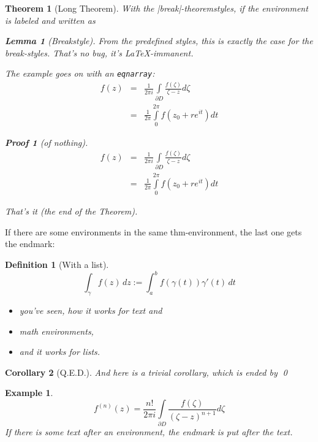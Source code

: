 \documentclass{article}
\theoremstyle{marginbreak}
\newtheorem{Theorem}{Theorem}
\theoremstyle{changebreak}
\newtheorem{Lemma}{Lemma}
\newtheorem{Corollary}[Theorem]{Corollary}
\theoremstyle{change}
\newtheorem{Example}{Example}
\theoremstyle{plain}
\newtheorem{Definition}{Definition}
\theoremstyle{nonumberplain}
\newtheorem{Proof}{Proof}
\begin{document}
\begin{Theorem}[Long Theorem]
With the |break|-theoremstyles, if the environment is labeled and 
written as
\begin{Lemma}[Breakstyle]\label{breakstyle}%
From the predefined styles, this is exactly the case for the break-styles.
That's no bug, it's \LaTeX-immanent.

The example goes on with an \verb|eqnarray|:
\begin{eqnarray}
f(z) &=&
   \frac{1}{2\pi i}
   \int \limits_{\partial D} \frac{f(\zeta)}{\zeta-z} d\zeta \\
&= &
   \frac{1}{2\pi}
   \int \limits_0^{2\pi}
      f(z_0 + re^{it}) dt
\end{eqnarray}
\end{Lemma}

\begin{Proof}[of nothing]
\begin{eqnarray*}
f(z) &=&
   \frac{1}{2\pi i}
   \int \limits_{\partial D} \frac{f(\zeta)}{\zeta-z} d\zeta \\
&= &
   \frac{1}{2\pi}
   \int \limits_0^{2\pi}
      f(z_0 + re^{it}) dt
\end{eqnarray*}
\end{Proof}
That's it (the end of the Theorem).
\end{Theorem}


If there are some environments in the same thm-environment,
the last one gets the endmark:
\begin{Definition}[With a list]
\begin{equation}
 \int_{\gamma} f(z)\, dz := \int_a^b f(\gamma (t)) \gamma'(t) \, dt
\end{equation}
\begin{itemize}
\item you've seen, how it works for text and
\item math environments,
\item and it works for lists.
\end{itemize}
\end{Definition}

\begin{Corollary}[Q.E.D.]
And here is a trivial corollary, which is ended by
\qed
\end{Corollary}

\begin{Example}
\[ f^{(n)}(z) =
   \frac{n!}{2\pi i} \int \limits _{\partial D}
            \frac{f(\zeta)}{(\zeta-z)^{n+1}} d\zeta \]
If there is some text after an environment, the endmark is put
after the text.
\end{Example}
\end{document}
